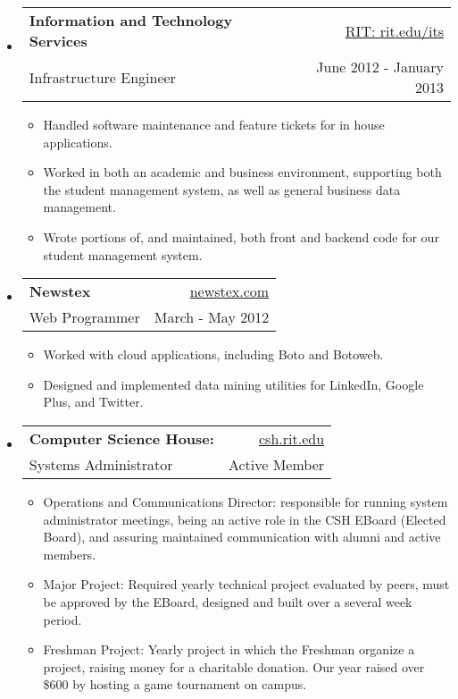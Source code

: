 \documentclass[letterpaper,11pt]{article}
\makeatletter
\newcommand{\resitem}[1]{\item #1 \vspace{-2pt}}
\newcommand{\ressubheading}[4]{
\begin{tabular*}{6.5in}{l@{\extracolsep{\fill}}r}
		\textbf{#1} & #2 \\
		{#3} & {#4} \\
\end{tabular*}\vspace{-6pt}}
\makeatother
\begin{document}
{\footnotesize
	\begin{itemize}
			\item 
			\ressubheading{Information and Technology Services}{\href{http://www.rit.edu/its/}{RIT: rit.edu/its}}{Infrastructure Engineer}{June 2012 - January 2013}
			{ \footnotesize
				\begin{itemize}
					\item{Handled software maintenance and feature tickets for in house applications.}
					\item{Worked in both an academic and business environment, supporting both the student management system, as well as general business data management.}
					\item{Wrote portions of, and maintained, both front and backend code for our student management system.}
				\end{itemize}
			}
		\item	
			\ressubheading{Newstex}{\href{http://www.newstex.com/}{newstex.com}}{Web Programmer}{March - May 2012} 
				{ \footnotesize 
				\begin{itemize}
					\item{Worked with cloud applications, including Boto and Botoweb.}
					\item{Designed and implemented data mining utilities for LinkedIn, Google Plus, and Twitter.}
				\end{itemize}
				}
		\item 
			\ressubheading{Computer Science House:}{\href{http://www.csh.rit.edu/}{csh.rit.edu}}{Systems Administrator}{Active Member} 
			{ \footnotesize
				\begin{itemize}		
					\resitem{Operations and Communications Director: responsible for running system administrator meetings, being an active role in the CSH EBoard (Elected Board), and assuring maintained communication with alumni and active members.}
					\resitem{{Major Project}: Required yearly technical project evaluated by peers, must be approved by the EBoard, designed and built over a several week period.}
					\resitem{{Freshman Project}: Yearly project in which the Freshman organize a project, raising money for a charitable donation. Our year raised over \$600 by hosting a game tournament on campus.} 
					
				\end{itemize}
			}		
	\end{itemize}  %
}
\end{document}
